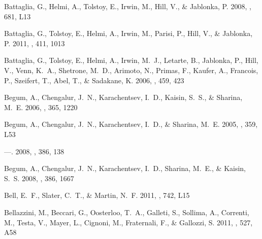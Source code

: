 \documentclass[manuscript]{aastex}
\begin{document}
\begin{thebibliography}{381}
{Battaglia}, G., {Helmi}, A., {Tolstoy}, E., {Irwin}, M., {Hill}, V., \&
  {Jablonka}, P. 2008, \apjl, 681, L13

{Battaglia}, G., {Tolstoy}, E., {Helmi}, A., {Irwin}, M., {Parisi}, P., {Hill},
  V., \& {Jablonka}, P. 2011, \mnras, 411, 1013

{Battaglia}, G., {Tolstoy}, E., {Helmi}, A., {Irwin}, M.~J., {Letarte}, B.,
  {Jablonka}, P., {Hill}, V., {Venn}, K.~A., {Shetrone}, M.~D., {Arimoto}, N.,
  {Primas}, F., {Kaufer}, A., {Francois}, P., {Szeifert}, T., {Abel}, T., \&
  {Sadakane}, K. 2006, \aap, 459, 423

{Begum}, A., {Chengalur}, J.~N., {Karachentsev}, I.~D., {Kaisin}, S.~S., \&
  {Sharina}, M.~E. 2006, \mnras, 365, 1220

{Begum}, A., {Chengalur}, J.~N., {Karachentsev}, I.~D., \& {Sharina}, M.~E.
  2005, \mnras, 359, L53

---. 2008{}, \mnras, 386, 138

{Begum}, A., {Chengalur}, J.~N., {Karachentsev}, I.~D., {Sharina}, M.~E., \&
  {Kaisin}, S.~S. 2008{}, \mnras, 386, 1667

{Bell}, E.~F., {Slater}, C.~T., \& {Martin}, N.~F. 2011, \apjl, 742, L15

{Bellazzini}, M., {Beccari}, G., {Oosterloo}, T.~A., {Galleti}, S., {Sollima},
  A., {Correnti}, M., {Testa}, V., {Mayer}, L., {Cignoni}, M., {Fraternali},
  F., \& {Gallozzi}, S. 2011, \aap, 527, A58


\end{thebibliography}
\end{document}
